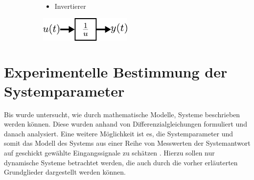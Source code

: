 \begin{figure}[h]
\begin{subfigure}[c]{\textwidth}
\begin{minipage}{0.5\textwidth}
		\end{minipage}
	\end{subfigure} 
	\vspace{1cm}
	\begin{subfigure}[c]{\textwidth}
		\begin{minipage}{0.5\textwidth}
			\begin{itemize}
				\item Invertierer
			\end{itemize}
		\end{minipage}\hfill
		\begin{minipage}{0.5\textwidth}
			\centering
			\includegraphics[width=0.5\textwidth]{Abbildungen/Modellbildung/PDF/Invertierer.pdf}
		\end{minipage}
	\end{subfigure}
\end{figure}
%
\vspace{-20pt}
%
\section{Experimentelle Bestimmung der Systemparameter}
\label{sec:experimental}
%
Bis wurde untersucht, wie durch mathematische Modelle, Systeme beschrieben werden können. Diese wurden anhand von Differenzialgleichungen formuliert und danach analysiert. Eine weitere Möglichkeit ist es, die Systemparameter und somit das Modell des Systems aus einer Reihe von Messwerten der Systemantwort auf geschickt gewählte Eingangssignale zu schätzen \cite{Foellinger94}. Hierzu sollen nur dynamische Systeme betrachtet werden, die auch durch die vorher erläuterten Grundglieder dargestellt werden können.
%
